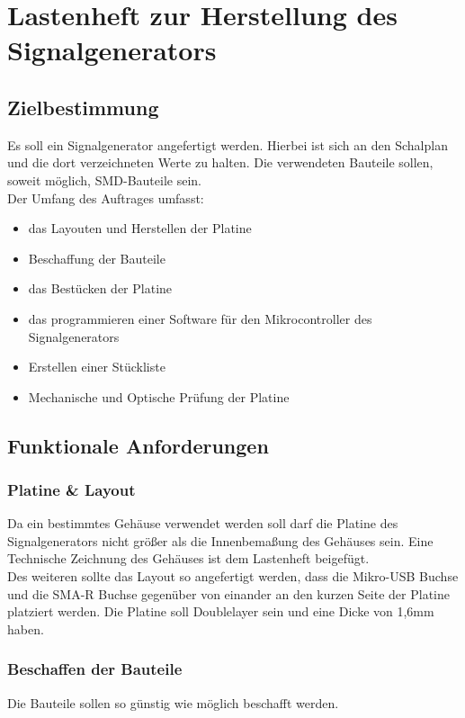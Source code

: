\section{Lastenheft zur Herstellung des Signalgenerators}
\subsection{Zielbestimmung}
Es soll ein Signalgenerator angefertigt werden. Hierbei ist sich an den Schalplan und die dort verzeichneten Werte zu halten.
Die verwendeten Bauteile sollen, soweit möglich, SMD-Bauteile sein.\\
Der Umfang des Auftrages umfasst:
\begin{itemize}
\item{das Layouten und Herstellen der Platine}
\item{Beschaffung der Bauteile}
\item{das Bestücken der Platine}
\item{das programmieren einer Software für den Mikrocontroller des Signalgenerators}
\item{Erstellen einer Stückliste}
\item{Mechanische und Optische Prüfung der Platine}
\end{itemize}

\subsection{Funktionale Anforderungen}

\subsubsection{Platine \& Layout}

Da ein bestimmtes Gehäuse verwendet werden soll darf die Platine des Signalgenerators nicht größer als
die Innenbemaßung des Gehäuses sein. Eine Technische Zeichnung des Gehäuses ist dem Lastenheft beigefügt.\\
Des weiteren sollte das Layout so angefertigt werden, dass die Mikro-USB Buchse und die SMA-R Buchse gegenüber
von einander an den kurzen Seite der Platine platziert werden.
Die Platine soll Doublelayer sein und eine Dicke von 1,6mm haben.

\subsubsection{Beschaffen der Bauteile}

Die Bauteile sollen so günstig wie möglich beschafft werden. 

